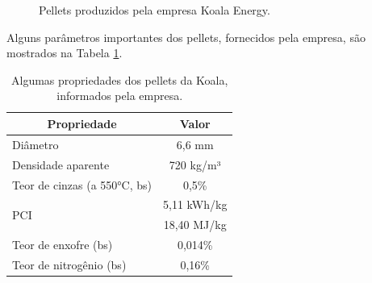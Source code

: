 \begin{figure}[!ht]
	\centering
	\caption{Pellets produzidos pela empresa Koala Energy.}
	\label{fig:pellets_koala}
\end{figure}

Alguns parâmetros importantes dos pellets, fornecidos pela empresa, são mostrados na Tabela \ref{tab:propriedadespellets}.

\begin{table}[!ht]
	\centering
	\small
	\renewcommand{\arraystretch}{1.3}
	\caption{Algumas propriedades dos pellets da Koala, informados pela empresa.}%
	\label{tab:propriedadespellets}
        \begin{tabular}{|l|c|}
        \hline
        \multicolumn{1}{|c|}{\textbf{Propriedade}} & \textbf{Valor} \\ \hline
        Diâmetro                                   & 6,6 mm         \\ \hline
        Densidade aparente                         & 720 kg/m³      \\ \hline
        Teor de cinzas (a 550°C, bs)               & 0,5\%          \\ \hline
        \multirow{2}{*}{PCI} & 5,11 kWh/kg    \\ \cline{2-2} 
                                                   & 18,40 MJ/kg    \\ \hline
        Teor de enxofre (bs)                       & 0,014\%        \\ \hline
        Teor de nitrogênio (bs)                    & 0,16\%         \\ \hline
        \end{tabular}
	\vspace{2mm}
\end{table}

